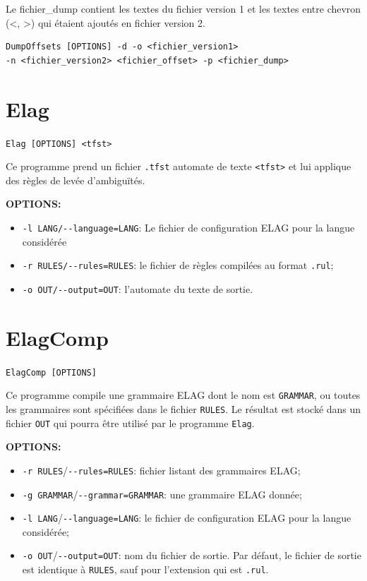 Le fichier\_dump contient les textes du fichier version 1 et les textes entre chevron (<, >) qui étaient ajoutés en fichier version 2.

\bigskip
\begin{verbatim}
DumpOffsets [OPTIONS] -d -o <fichier_version1>
-n <fichier_version2> <fichier_offset> -p <fichier_dump>
\end{verbatim}
\bigskip


\section{Elag}
\verb+Elag [OPTIONS] <tfst>+

\bigskip
\noindent Ce programme prend un fichier \verb+.tfst+ automate de texte \verb+<tfst>+ et lui applique
des règles de levée d’ambiguïtés. 

\bigskip
\noindent \textbf{OPTIONS:}
\begin{itemize}
\item \verb+-l LANG/--language=LANG+: Le fichier de configuration ELAG pour la langue considérée
  \item \verb+-r RULES/--rules=RULES+: le fichier de règles compilées au format \verb+.rul+;
  \item \verb+-o OUT/--output=OUT+: l’automate du texte de sortie.
\end{itemize}







\section{ElagComp}
\verb+ElagComp [OPTIONS]+

\bigskip
\noindent Ce programme compile une grammaire ELAG dont le nom est \verb+GRAMMAR+,  ou toutes les grammaires sont spécifiées dans le fichier \verb+RULES+. Le résultat est stocké dans un fichier \verb+OUT+ qui pourra être utilisé par le programme \verb+Elag+.

\bigskip
\noindent \textbf{OPTIONS:}
\begin{itemize}
  \item \verb+-r RULES+/\verb+--rules=RULES+: fichier listant des grammaires ELAG;
  \item \verb+-g GRAMMAR+/\verb+--grammar=GRAMMAR+: une grammaire ELAG donnée;
  \item \verb+-l LANG+/\verb+--language=LANG+: le fichier de configuration ELAG pour la langue
  	  considérée;
  \item \verb+-o OUT+/\verb+--output=OUT+: nom du fichier de sortie. Par défaut, le fichier de
  	  sortie est identique à \verb+RULES+, sauf pour l’extension qui est
  	  \verb+.rul+.
\end{itemize}








